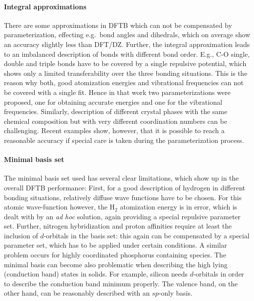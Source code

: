 \documentclass{revtex4-1}
\begin{document}
\paragraph{Integral approximations} There are some approximations
in DFTB which can not be compensated by parameterization, effecting e.g.\ bond
angles and dihedrals, which on average show an accuracy slightly less than
DFT/DZ. Further, the integral approximation leads to an imbalanced description
of bonds with different bond order. E.g., C-O single, double and triple bonds
have to be covered by a single repulsive potential, which shows only a limited
transferability over the three bonding situations. This is the reason why both,
good atomization energies and vibrational frequencies can not be covered with a
single fit.\cite{Gaus2012} Hence in that work two parameterizations were
proposed, one for obtaining accurate energies and one for the vibrational
frequencies.  Similarly, description of different crystal phases with the same
chemical composition but with very different coordination numbers can be
challenging. Recent examples show,\cite{Hellstrom2013,Fihey2015} however, that
it is possible to reach a reasonable accuracy if special care is taken during
the parameterization process.

\paragraph{Minimal basis set}
The minimal basis set used has several clear limitations, which show up in the
overall DFTB performance: First, for a good description of hydrogen in different
bonding situations, relatively diffuse wave functions have to be chosen.  For
this atomic wave-function however, the H$_2$ atomization energy is in error,
which is dealt with by an {\it ad hoc} solution, again providing a special
repulsive parameter set.\cite{Gaus2012} Further, nitrogen hybridization and
proton affinities require at least the inclusion of $d$-orbitals in the basis
set: this again can be compensated by a special parameter set, which has to be
applied under certain conditions.\cite{Gaus2012} A similar problem occurs for
highly coordinated phosphorus containing species.\cite{Gaus2015} The minimal
basis can become also problematic when describing the high lying (conduction
band) states in solids. For example, silicon needs $d$-orbitals in order to
describe the conduction band minimum properly. The valence band, on the other
hand, can be reasonably described with an $sp$-only basis.
\end{document}
